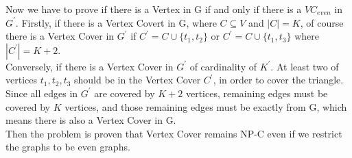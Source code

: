 \documentclass[12pt]{report}
\begin{document}
Now we have to prove if there is a Vertex in G if and only if there is a $VC_{even}$ in $G^{'}$. Firstly, if there is a Vertex Covert in G, where $C \subseteq V$ and $|C| = K$, of course there is a Vertex Cover in $G^{'}$ if $C^{'} = C \cup \{t_{1}, t_{2}\}$ or $C^{'} = C \cup \{t_{1}, t_{3}\}$ where $|C^{'}| = K+2$. \\
Conversely, if there is a Vertex Cover in $G^{'}$ of cardinality of $K^{'}$. At least two of vertices $t_{1}, t_{2}, t_{3}$ should be in the Vertex Cover $C^{'}$, in order to cover the triangle. Since all edges in $G^{'}$ are covered by $K + 2$ vertices, remaining edges must be covered by $K$ vertices, and those remaining edges must be exactly from G, which means there is also a Vertex Cover in G. \\
Then the problem is proven that Vertex Cover remains NP-C even if we restrict the graphs to be even graphs.
\end{document}
